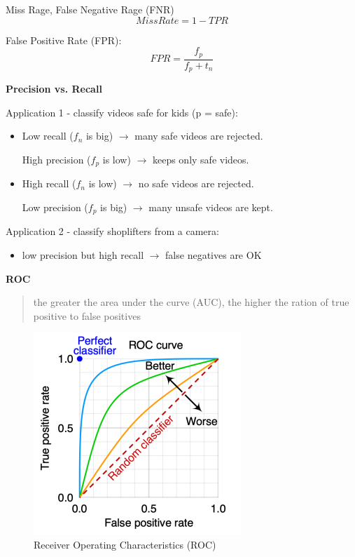 \documentclass[11pt,twoside,landscape]{article}
\begin{document}
\begin{multicols}{3}
Miss Rage, False Negative Rage (FNR)
\begin{equation}
Miss Rate = 1 - TPR
\end{equation}

False Positive Rate (FPR):
\begin{equation}
FPR = \frac{f_p}{f_p + t_n}
\end{equation}


\textbf{Precision vs. Recall}

Application 1 - classify videos safe for kids (p = safe):
\begin{itemize}
\item Low recall (\(f_n\) is big) \(\rightarrow\) many safe videos are rejected.

High precision (\(f_p\) is low) \(\rightarrow\) keeps only safe videos.

\item High recall (\(f_n\) is low) \(\rightarrow\) no safe videos are rejected.

Low precision (\(f_p\) is big) \(\rightarrow\) many unsafe videos are kept.
\end{itemize}


Application 2 - classify shoplifters from a camera:
\begin{itemize}
\item low precision but high recall \(\rightarrow\) false negatives are OK
\end{itemize}


\textbf{ROC}

\begin{quote}
the greater the area under the curve (AUC), the higher the ration of true positive to false positives
\end{quote}


\begin{figure}[htbp]
\centering
\includegraphics[width=.9\linewidth]{img/roc.png}
\caption{Receiver Operating Characteristics (ROC)}
\end{figure}



\end{multicols}
\end{document}

